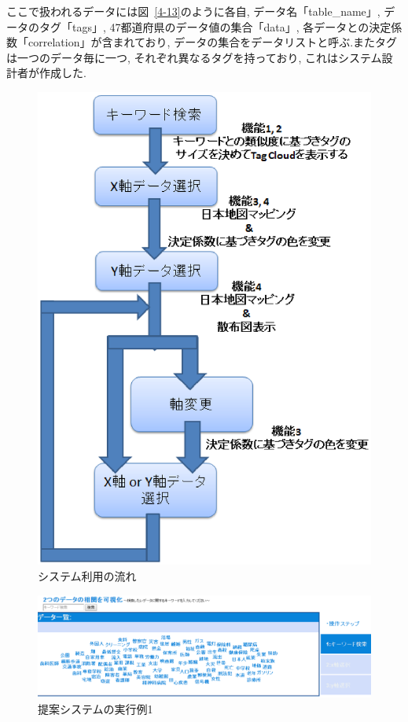 \documentclass[sotsuron]{kuee}
\begin{document}
ここで扱われるデータには図~\ref{4-13}のように各自, データ名「table\_name」, データのタグ「tags」,
47都道府県のデータ値の集合「data」, 各データとの決定係数「correlation」が含まれており,
データの集合をデータリストと呼ぶ.またタグは一つのデータ毎に一つ, それぞれ異なるタグを持っており, これはシステム設計者が作成した.


\begin{figure}
  \begin{center}
    \unitlength=1mm
   \includegraphics[width=120mm]{fig4-1.eps}
  \end{center}
  \caption{システム利用の流れ}
  \label{4-1}
\end{figure}

\begin{figure}
  \begin{center}
    \unitlength=1mm
   \includegraphics[width=120mm]{fig4-2.eps}
  \end{center}
  \caption{提案システムの実行例1}
  \label{4-2}
\end{figure}
\end{document}
